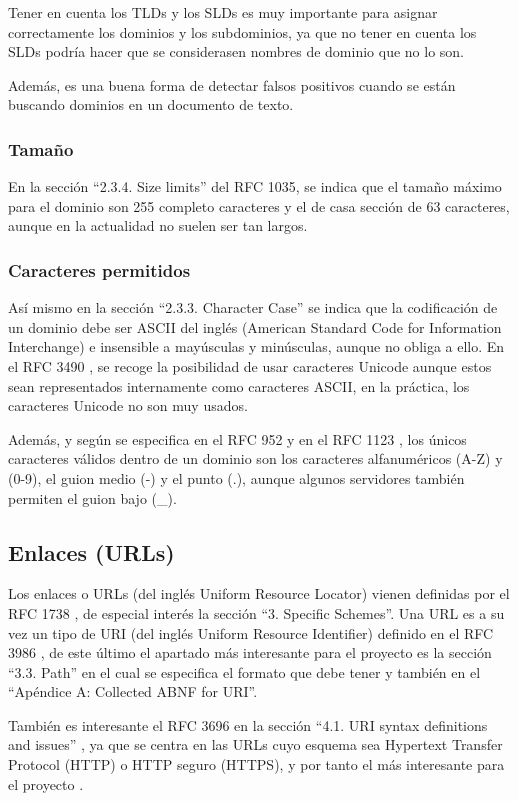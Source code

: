 Tener en cuenta los TLDs y los SLDs es muy importante para asignar correctamente los dominios y los subdominios, ya que no tener en cuenta los SLDs podría hacer que se considerasen nombres de dominio que no lo son. 

Además, es una buena forma de detectar falsos positivos cuando se están buscando dominios en un documento de texto.

\subsubsection{Tamaño}
En la sección “2.3.4. Size limits” del RFC 1035, se indica que el tamaño máximo para el dominio son 255 completo caracteres y el de casa sección de 63 caracteres, aunque en la actualidad no suelen ser tan largos. 

\subsubsection{Caracteres permitidos}
Así mismo en la sección “2.3.3. Character Case” se indica que la codificación de un dominio debe ser ASCII del inglés (American Standard Code for Information Interchange) e insensible a mayúsculas y minúsculas, aunque no obliga a ello. En el RFC 3490 \cite{rfc3490}, se recoge la posibilidad de usar caracteres Unicode aunque estos sean representados internamente como caracteres ASCII, en la práctica, los caracteres Unicode no son muy usados.

Además, y según se especifica en el RFC 952 \cite{rfc952} y en el RFC 1123 \cite{rfc1123}, los únicos caracteres válidos dentro de un dominio son los caracteres alfanuméricos (A-Z) y (0-9), el guion medio (-) y el punto (.), aunque algunos servidores también permiten el guion bajo (\_).

\subsection{Enlaces (URLs)}
Los enlaces o URLs (del inglés Uniform Resource Locator) vienen definidas por el RFC 1738 \cite{rfc1738}, de especial interés la sección “3. Specific Schemes”. Una URL es a su vez un tipo de URI (del inglés Uniform Resource Identifier) definido en el RFC 3986 \cite{rfc3986}, de este último el apartado más interesante para el proyecto es la sección “3.3.  Path” en el cual se especifica el formato que debe tener y también en el “Apéndice A: Collected ABNF for URI”.

También es interesante el RFC 3696 en la sección “4.1.  URI syntax definitions and issues” \cite{rfc3696_section4_1}, ya que se centra en las URLs cuyo esquema sea Hypertext Transfer Protocol (HTTP) o HTTP seguro (HTTPS), y por tanto el más interesante para el proyecto .

